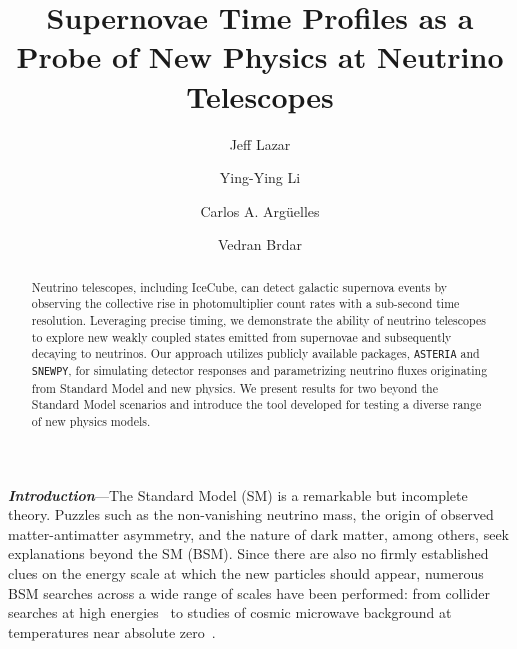 \documentclass[aps,twocolumn,prl,showpacs,showkeys,preprintnumbers,superscriptaddress,nobibnotes,floatfix,longbibliography,notitlepage,nofootinbib]{revtex4-2}
\begin{document}

\title{
Supernovae Time Profiles as a Probe of New Physics at Neutrino Telescopes
}

\author{Jeff Lazar}
\author{Ying-Ying Li}
\author{Carlos A. Arg\"{u}elles}
\author{Vedran Brdar}


\begin{abstract}
Neutrino telescopes, including IceCube, can detect galactic supernova events by observing the collective rise in photomultiplier count rates with a sub-second time resolution. 
Leveraging precise timing, we demonstrate the ability of neutrino telescopes to explore new weakly coupled states emitted from supernovae and subsequently decaying to neutrinos.
Our approach utilizes publicly available packages, \texttt{ASTERIA} and \texttt{SNEWPY}, for simulating detector responses and parametrizing neutrino fluxes originating from Standard Model and new physics. 
We present results for two beyond the Standard Model scenarios and introduce the tool developed for testing a diverse range of new physics models.
\end{abstract}

\maketitle

\textbf{\textit{Introduction}}---The Standard Model (SM) is a remarkable but incomplete theory. 
Puzzles such as the non-vanishing neutrino mass, the origin of observed matter-antimatter asymmetry, and the nature of dark matter, among others, seek explanations beyond the SM (BSM).
Since there are also no firmly established clues on the energy scale at which the new particles should appear, numerous BSM searches across a wide range of scales have been performed: from collider searches at high energies~\cite{Nath:2010zj} to studies of cosmic microwave background at temperatures near absolute zero~\cite{Baumann:2015rya}.
\end{document}
